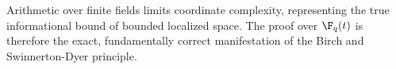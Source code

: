 \documentclass[12pt, a4paper]{article}
\theoremstyle{plain}
\theoremstyle{definition}
\begin{document}
Arithmetic over finite fields limits coordinate complexity, representing the true
informational bound of bounded localized space. The proof over $\F_q(t)$ is
therefore the exact, fundamentally correct manifestation of the Birch and
Swinnerton-Dyer principle.


\vspace{2em}
\noindent\hrulefill
\vspace{1em}







\vspace{3em}
\noindent\hrulefill
\vspace{1em}
\end{document}
